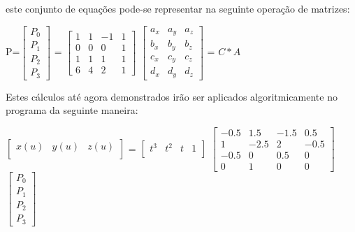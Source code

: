 este conjunto de equações pode-se representar na seguinte operação de matrizes:

P=$\begin{bmatrix}
		       P_{0}           \\[0.3em]
		       P_{1}   \\[0.3em]
		       P_{2} \\[0.3em]
		       P_{3}
		     \end{bmatrix}$ = $\begin{bmatrix}
		      					 1 & 1 & -1 & 1           \\[0.3em]
		       					 0 & 0 & 0 & 1   \\[0.3em]
		       					 1 & 1 & 1 & 1 \\[0.3em]
		      					 6 & 4 & 2 & 1
		     					\end{bmatrix}$  $\begin{bmatrix}
		       									a_{x} & a_{y} & a_{z}    \\[0.3em]
		     								  	b_{x} & b_{y} & b_{z}    \\[0.3em]
		       									c_{x} & c_{y} & c_{z}    \\[0.3em]
		       									d_{x} & d_{y} & d_{z} 
		     					\end{bmatrix}$   = $C * A$

Estes cálculos até agora demonstrados irão ser aplicados algoritmicamente no programa da seguinte maneira:

$\begin{bmatrix}
       x(u) & y(u) & z(u)           \\[0.3em]
\end{bmatrix}$ = 
$\begin{bmatrix}
       t^{3} & t^{2} & t & 1          \\[0.3em]
		\end{bmatrix}$ $\begin{bmatrix}
		      					 -0.5 & 1.5 & -1.5 & 0.5           \\[0.3em]
		       					 1 & -2.5 & 2 & -0.5   \\[0.3em]
		       					 -0.5 & 0 & 0.5 & 0 \\[0.3em]
		      					 0 & 1 & 0 & 0
		     					\end{bmatrix}$ $\begin{bmatrix}
         							    P_{0}           \\[0.3em]
       									P_{1}   \\[0.3em]
       									P_{2} \\[0.3em]
       									P_{3}
     \end{bmatrix}$